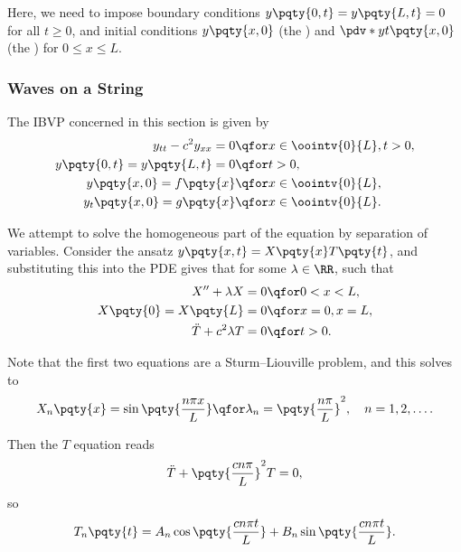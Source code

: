 {Here, we need to impose boundary conditions \(y\pqty{0, t} = y\pqty{L, t} = 0\) for all \(t \geq 0\), and initial conditions \(y\pqty{x, 0}\) (the ) and \(\pdv*{y}{t} \pqty{x, 0}\) (the ) for \(0 \leq x \leq L\).

\subsubsection{Waves on a String}

The IBVP concerned in this section is given by
\begin{subequations}
    \begin{align}
        y_{tt} - c^2 y_{xx} = 0 &\qfor x \in \oointv{0}{L}, t > 0, \\
        y\pqty{0, t} = y\pqty{L, t} = 0 &\qfor t > 0, \\
        y\pqty{x, 0} = f\pqty{x} &\qfor x \in \oointv{0}{L}, \\
        y_t\pqty{x, 0} = g\pqty{x} &\qfor x \in \oointv{0}{L}.
    \end{align}
\end{subequations}

We attempt to solve the homogeneous part of the equation by separation of variables. Consider the ansatz \(y\pqty{x, t} = X\pqty{x} T\pqty{t}\), and substituting this into the PDE gives that for some \(\lambda \in \RR\), such that
\begin{subequations}
    \begin{align}
        X'' + \lambda X = 0 &\qfor 0 < x < L, \\
        X\pqty{0} = X\pqty{L} = 0 &\qfor x = 0, x = L, \\
        \ddot{T} + c^2 \lambda T = 0 &\qfor t > 0.
    \end{align}
\end{subequations}

Note that the first two equations are a Sturm--Liouville problem, and this solves to
\begin{equation}
    X_n\pqty{x} = \sin \pqty{\frac{n \pi x}{L}} \qfor \lambda_n = \pqty{\frac{n \pi}{L}}^2, \quad n = 1, 2, \ldots.
\end{equation}

Then the \(T\) equation reads
\begin{equation}
    \ddot{T} + \pqty{\frac{c n \pi}{L}}^2 T = 0,
\end{equation}
so
\begin{equation}
    T_n\pqty{t} = A_n \cos \pqty{\frac{c n \pi t}{L}} + B_n \sin \pqty{\frac{c n \pi t}{L}}.
\end{equation}

}
